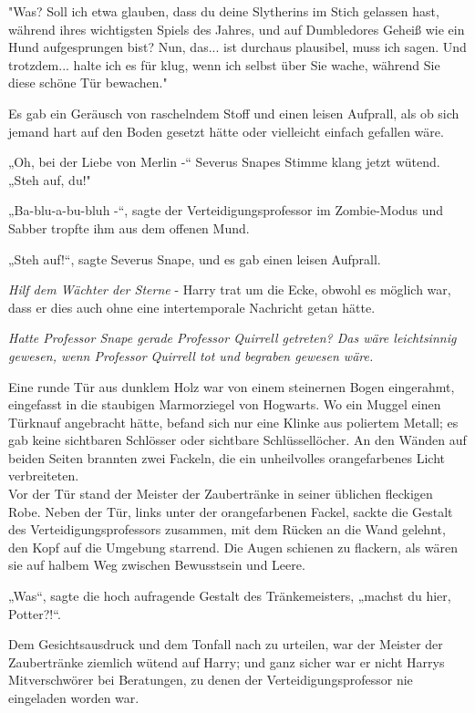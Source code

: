{"Was? Soll ich etwa glauben, dass du deine Slytherins im Stich gelassen hast, während ihres wichtigsten Spiels des Jahres, und auf Dumbledores Geheiß wie ein Hund aufgesprungen bist? Nun, das... ist durchaus plausibel, muss ich sagen. Und trotzdem... halte ich es für klug, wenn ich selbst über Sie wache, während Sie diese schöne Tür bewachen."

Es gab ein Geräusch von raschelndem Stoff und einen leisen Aufprall, als ob sich jemand hart auf den Boden gesetzt hätte oder vielleicht einfach gefallen wäre.

„Oh, bei der Liebe von Merlin -“ Severus Snapes Stimme klang jetzt wütend. „Steh auf, du!"

„Ba-blu-a-bu-bluh -“, sagte der Verteidigungsprofessor im Zombie-Modus und Sabber tropfte ihm aus dem offenen Mund.

„Steh auf!“, sagte Severus Snape, und es gab einen leisen Aufprall.

\emph{Hilf dem Wächter der Sterne} - Harry trat um die Ecke, obwohl es möglich war, dass er dies auch ohne eine intertemporale Nachricht getan hätte.

\emph{Hatte Professor Snape gerade Professor Quirrell getreten? Das wäre leichtsinnig gewesen, wenn Professor Quirrell tot und begraben gewesen wäre.}

Eine runde Tür aus dunklem Holz war von einem steinernen Bogen eingerahmt, eingefasst in die staubigen Marmorziegel von Hogwarts. Wo ein Muggel einen Türknauf angebracht hätte, befand sich nur eine Klinke aus poliertem Metall; es gab keine sichtbaren Schlösser oder sichtbare Schlüssellöcher. An den Wänden auf beiden Seiten brannten zwei Fackeln, die ein unheilvolles orangefarbenes Licht verbreiteten.\\ Vor der Tür stand der Meister der Zaubertränke in seiner üblichen fleckigen Robe. Neben der Tür, links unter der orangefarbenen Fackel, sackte die Gestalt des Verteidigungsprofessors zusammen, mit dem Rücken an die Wand gelehnt, den Kopf auf die Umgebung starrend. Die Augen schienen zu flackern, als wären sie auf halbem Weg zwischen Bewusstsein und Leere.

„Was“, sagte die hoch aufragende Gestalt des Tränkemeisters, „machst du hier, Potter?!“.

Dem Gesichtsausdruck und dem Tonfall nach zu urteilen, war der Meister der Zaubertränke ziemlich wütend auf Harry; und ganz sicher war er nicht Harrys Mitverschwörer bei Beratungen, zu denen der Verteidigungsprofessor nie eingeladen worden war.

}

